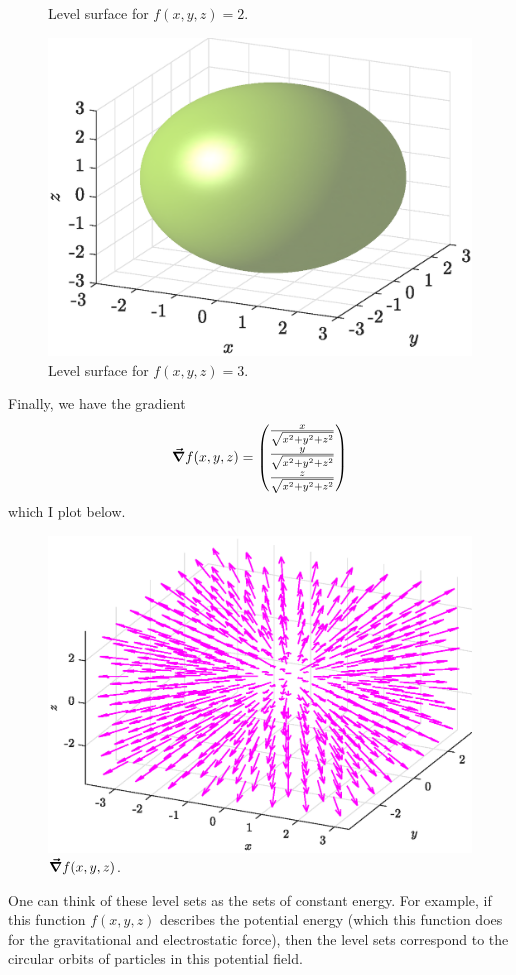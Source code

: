 \documentclass[12pt]{article} %
\begin{document}
\begin{solution}
\begin{enumerate}[(a)]
\begin{figure}[H]
        \caption{Level surface for $f(x,y,z)=2$.}
    \end{figure}
    \begin{figure}[H]
        \centering
        \includegraphics[width=.65\textwidth]{figures/7c_3}
        \caption{Level surface for $f(x,y,z)=3$.}
    \end{figure}

    Finally, we have the gradient
    \[
    \boldsymbol{\vec{\nabla}} f(x,y,z) = \begin{pmatrix} \frac{x}{\sqrt{x^2+y^2+z^2}} \\ \frac{y}{\sqrt{x^2+y^2+z^2}} \\ \frac{z}{\sqrt{x^2+y^2+z^2}} \end{pmatrix}
    \]
    which I plot below.

    \begin{figure}[H]
        \centering
        \includegraphics[width=.65\textwidth]{figures/7c_gradient}
        \caption{$\boldsymbol{\vec{\nabla}} f(x,y,z)$.}
    \end{figure}
\end{enumerate}
One can think of these level sets as the sets of constant energy. For example, if this function $f(x,y,z)$ describes the potential energy (which this function does for the gravitational and electrostatic force), then the level sets correspond to the circular orbits of particles in this potential field. 
\end{solution}
\end{document}

